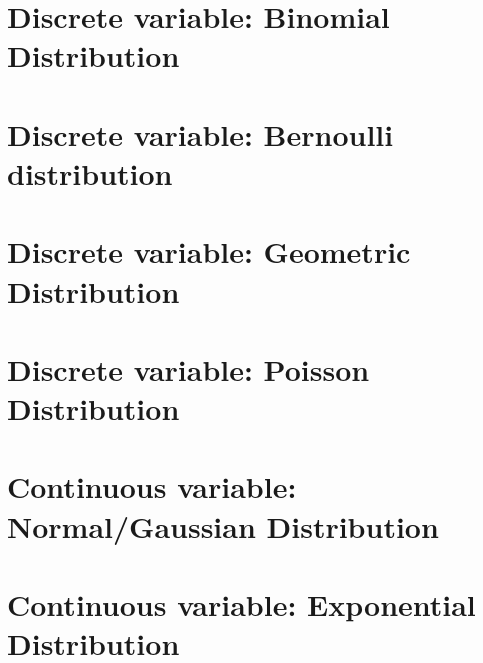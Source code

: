 \section{Discrete variable: Binomial Distribution}

\section{Discrete variable: Bernoulli distribution}

\section{Discrete variable: Geometric Distribution}

\section{Discrete variable: Poisson Distribution}

\section{Continuous variable: Normal/Gaussian Distribution}

\section{Continuous variable: Exponential Distribution}



